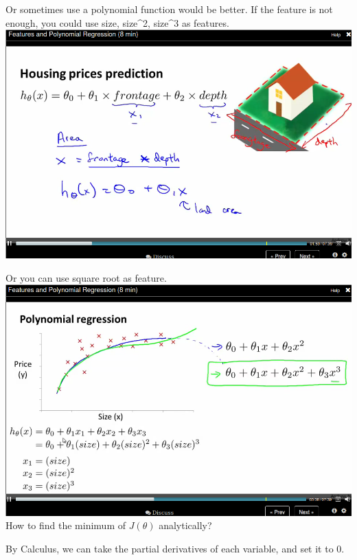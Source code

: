\documentclass[11pt]{article}
\begin{document}
Or sometimes use a polynomial function would be better. If the feature is not enough, you could use size, size\^{}2, size\^{}3 as features.
\includegraphics[width=.9\linewidth]{./images/screenshot-18.png}

Or you can use square root as feature.
\includegraphics[width=.9\linewidth]{./images/screenshot-19.png}
How to find the minimum of \(J(\theta)\) analytically?

By Calculus, we can take the partial derivatives of each variable, and set it to 0.
\end{document}
